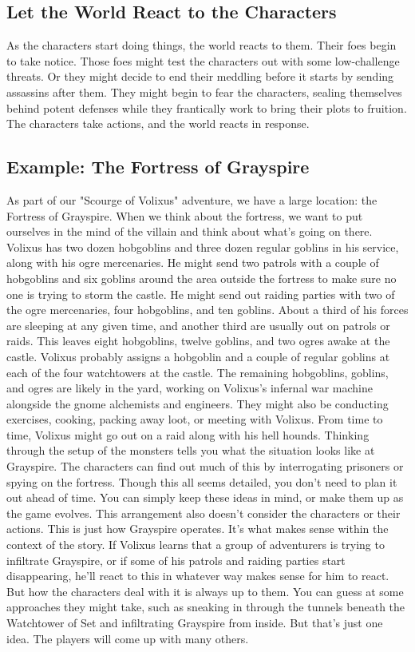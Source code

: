 \documentclass[10pt,a4paper,twoside,bg=print,twocolumn,openany,nodeprecatedcode]{dndbook}
\begin{document}
\subsection{Let the World React to the Characters}
As the characters start doing things, the world reacts to them. Their foes begin to take notice. Those foes might test the characters out with some low-challenge threats. Or they might decide to end their meddling before it starts by sending assassins after them. They might begin to fear the characters, sealing themselves behind potent defenses while they frantically work to bring their plots to fruition. The characters take actions, and the world reacts in response.
\subsection{Example: The Fortress of Grayspire}
As part of our "Scourge of Volixus" adventure, we have a large location: the Fortress of Grayspire. When we think about the fortress, we want to put ourselves in the mind of the villain and think about what's going on there.
Volixus has two dozen hobgoblins and three dozen regular goblins in his service, along with his ogre mercenaries. He might send two patrols with a couple of hobgoblins and six goblins around the area outside the fortress to make sure no one is trying to storm the castle. He might send out raiding parties with two of the ogre mercenaries, four hobgoblins, and ten goblins.
About a third of his forces are sleeping at any given time, and another third are usually out on patrols or raids. This leaves eight hobgoblins, twelve goblins, and two ogres awake at the castle. Volixus probably assigns a hobgoblin and a couple of regular goblins at each of the four watchtowers at the castle. The remaining hobgoblins, goblins, and ogres are likely in the yard, working on Volixus's infernal war machine alongside the gnome alchemists and engineers. They might also be conducting exercises, cooking, packing away loot, or meeting with Volixus. From time to time, Volixus might go out on a raid along with his hell hounds.
Thinking through the setup of the monsters tells you what the situation looks like at Grayspire. The characters can find out much of this by interrogating prisoners or spying on the fortress. Though this all seems detailed, you don't need to plan it out ahead of time. You can simply keep these ideas in mind, or make them up as the game evolves.
This arrangement also doesn't consider the characters or their actions. This is just how Grayspire operates. It's what makes sense within the context of the story. If Volixus learns that a group of adventurers is trying to infiltrate Grayspire, or if some of his patrols and raiding parties start disappearing, he'll react to this in whatever way makes sense for him to react. But how the characters deal with it is always up to them. You can guess at some approaches they might take, such as sneaking in through the tunnels beneath the Watchtower of Set and infiltrating Grayspire from inside. But that's just one idea. The players will come up with many others.
\end{document}
